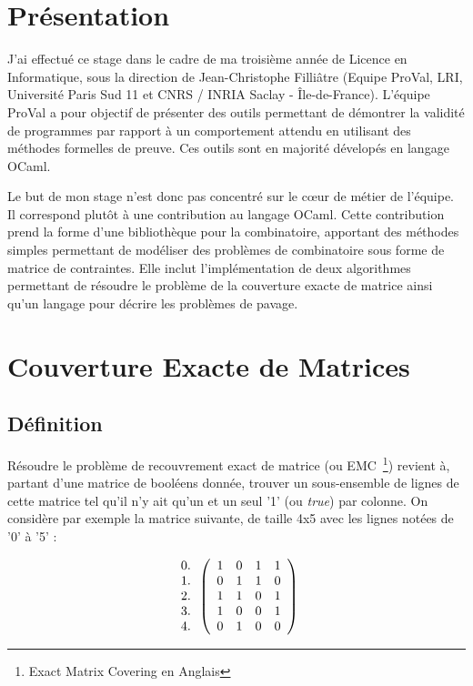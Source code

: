 \documentclass[a4paper]{article}
\begin{document}
\newpage
\tableofcontents
\newpage
\listoffigures

\newpage
\section{Présentation}


J'ai effectué ce stage dans le cadre de ma troisième année de Licence en 
Informatique, sous la direction de Jean-Christophe Filliâtre (Equipe ProVal, 
LRI, Université Paris Sud 11 et CNRS / INRIA Saclay - Île-de-France). L'équipe 
ProVal a pour objectif de présenter des outils permettant de démontrer la 
validité de programmes par rapport à un comportement attendu en utilisant des
méthodes formelles de preuve.
Ces outils sont en majorité dévelopés en langage OCaml. 

Le but de mon stage n'est donc pas concentré sur le c\oe ur de métier de 
l'équipe. Il correspond plutôt à une contribution au langage OCaml. 
Cette contribution
prend la forme d'une bibliothèque pour la combinatoire, apportant
des méthodes simples permettant de modéliser des problèmes de combinatoire
sous forme de matrice de contraintes. Elle inclut l'implémentation de 
deux algorithmes permettant de résoudre le problème de la couverture exacte de
matrice ainsi qu'un langage pour décrire les problèmes de pavage.


\section{Couverture Exacte de Matrices}

\subsection{Définition}

Résoudre le problème de recouvrement exact de matrice 
(ou EMC~\footnote{Exact Matrix Covering en Anglais}) revient à,
partant d'une matrice de booléens donnée, trouver un sous-ensemble de 
lignes de cette matrice tel qu'il n'y ait qu'un et un seul '1' (ou \emph{true}) 
par colonne.
On considère par exemple la matrice suivante, de taille 4x5 avec les lignes
notées de '0' à '5' : 

\[
  \begin{array}{ c }
   0. \\
   1. \\
   2. \\
   3. \\
   4. \\
  \end{array}
\left(
  \begin{array}{ c c c c c }
   1 & 0 & 1 & 1 \\
   0 & 1 & 1 & 0 \\
   1 & 1 & 0 & 1 \\
   1 & 0 & 0 & 1 \\
   0 & 1 & 0 & 0
  \end{array} \right)
\]
\end{document}
